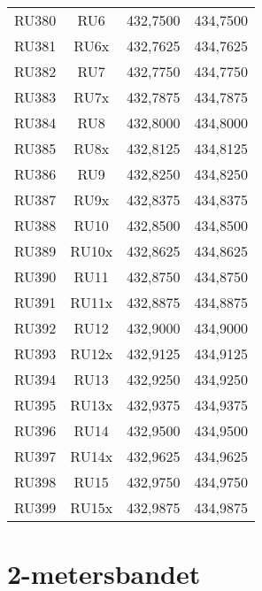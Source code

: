 \begin{tabular}{ r | c | l | l }
	RU380 & RU6   & 432,7500       & 434,7500       \\
	RU381 & RU6x  & 432,7625       & 434,7625       \\
	RU382 & RU7   & 432,7750       & 434,7750       \\
	RU383 & RU7x  & 432,7875       & 434,7875       \\
	RU384 & RU8   & 432,8000       & 434,8000       \\
	RU385 & RU8x  & 432,8125       & 434,8125       \\
	RU386 & RU9   & 432,8250       & 434,8250       \\
	RU387 & RU9x  & 432,8375       & 434,8375       \\
	RU388 & RU10  & 432,8500       & 434,8500       \\
	RU389 & RU10x & 432,8625       & 434,8625       \\
	RU390 & RU11  & 432,8750       & 434,8750       \\
	RU391 & RU11x & 432,8875       & 434,8875       \\
	RU392 & RU12  & 432,9000       & 434,9000       \\
	RU393 & RU12x & 432,9125       & 434,9125       \\
	RU394 & RU13  & 432,9250       & 434,9250       \\
	RU395 & RU13x & 432,9375       & 434,9375       \\
	RU396 & RU14  & 432,9500       & 434,9500       \\
	RU397 & RU14x & 432,9625       & 434,9625       \\
	RU398 & RU15  & 432,9750       & 434,9750       \\
	RU399 & RU15x & 432,9875       & 434,9875       \\
\end{tabular}

\newpage

\section{2-metersbandet}

